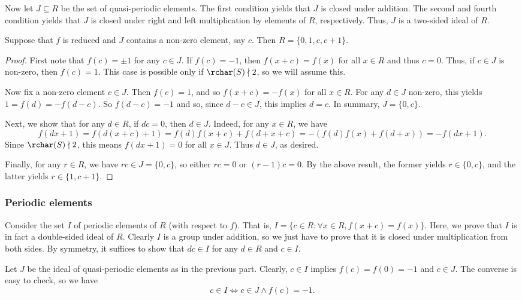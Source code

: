 Now let $J \subseteq R$ be the set of quasi-periodic elements.
The first condition yields that $J$ is closed under addition.
The second and fourth condition yields that $J$ is closed under right and left multiplication by elements of $R$, respectively.
Thus, $J$ is a two-sided ideal of $R$.

\begin{lemma}\label{2012a5-quasi-periodic-non-zero}
Suppose that $f$ is reduced and $J$ contains a non-zero element, say $c$.
Then $R = \{0, 1, c, c + 1\}$.
\end{lemma}
\begin{proof}
First note that $f(c) = \pm 1$ for any $c \in J$.
If $f(c) = -1$, then $f(x + c) = f(x)$ for all $x \in R$ and thus $c = 0$.
Thus, if $c \in J$ is non-zero, then $f(c) = 1$.
This case is possible only if $\rchar(S) \nmid 2$, so we will assume this.

Now fix a non-zero element $c \in J$.
Then $f(c) = 1$, and so $f(x + c) = -f(x)$ for all $x \in R$.
For any $d \in J$ non-zero, this yields $1 = f(d) = -f(d - c)$.
So $f(d - c) = -1$ and so, since $d - c \in J$, this implies $d = c$.
In summary, $J = \{0, c\}$.

Next, we show that for any $d \in R$, if $dc = 0$, then $d \in J$.
Indeed, for any $x \in R$, we have
\[ f(dx + 1) = f(d(x + c) + 1) = f(d) f(x + c) + f(d + x + c) = -(f(d) f(x) + f(d + x)) = -f(dx + 1). \]
Since $\rchar(S) \nmid 2$, this means $f(dx + 1) = 0$ for all $x \in J$.
Thus $d \in J$, as desired.

Finally, for any $r \in R$, we have $rc \in J = \{0, c\}$, so either $rc = 0$ or $(r - 1)c = 0$.
By the above result, the former yields $r \in \{0, c\}$, and the latter yields $r \in \{1, c + 1\}$.
\end{proof}




\subsubsection*{Periodic elements}

Consider the set $I$ of periodic elements of $R$ (with respect to $f$).
That is, $I = \{c \in R : \forall x \in R, f(x + c) = f(x)\}$.
Here, we prove that $I$ is in fact a double-sided ideal of $R$.
Clearly $I$ is a group under addition, so we just have to prove that it is closed under multiplication from both sides.
By symmetry, it suffices to show that $dc \in I$ for any $d \in R$ and $c \in I$.

Let $J$ be the ideal of quasi-periodic elements as in the previous part.
Clearly, $c \in I$ implies $f(c) = f(0) = -1$ and $c \in J$.
The converse is easy to check, so we have
\[ c \in I \iff c \in J \wedge f(c) = -1. \]

